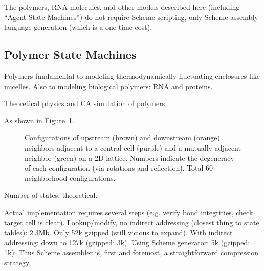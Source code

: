\documentclass{acm_proc_article-sp}
\begin{document}
The polymers, RNA molecules, and other models described here (including ``Agent State Machines'') do not require Scheme scripting, only Scheme assembly language generation (which is a one-time cost).

\subsection{Polymer State Machines}

Polymers fundamental to modeling thermodynamically fluctuating enclosures like micelles.
Also to modeling biological polymers: RNA and proteins.

Theoretical physics \cite{DoiEdwards1988} and CA simulation of polymers \cite{PhysRevLett.64.1915,journals/pc/OstrovskyCSB01}

As shown in Figure~\ref{fig:polymer}.

\begin{figure}
\caption{
\label{fig:polymer}
Configurations of upstream (brown) and downstream (orange) neighbors adjacent to a central cell (purple) and a mutually-adjacent neighbor (green) on a 2D lattice.
Numbers indicate the degeneracy of each configuration (via rotations and reflection).
Total 60 neighborhood configurations.
}
\end{figure}

Number of states, theoretical.

Actual implementation requires several steps (e.g. verify bond integrities, check target cell is clear).
Lookup/modify, no indirect addressing (closest thing to state tables): 2.3Mb.
Only 52k gzipped (still vicious to expand).
With indirect addressing: down to 127k (gzipped: 3k).
Using Scheme generator: 5k (gzipped: 1k).
Thus Scheme assembler is, first and foremost, a straightforward compression strategy.
\end{document}
